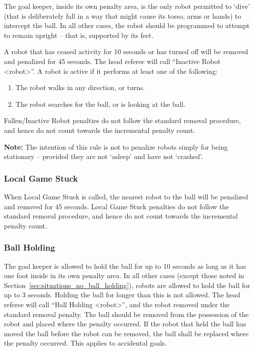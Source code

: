 The goal keeper, inside its own penalty area, is the only robot permitted to `dive' (that is deliberately fall in a way that might cause its torso, arms or hands) to intercept the ball. In all other cases, the robot should be programmed to attempt to remain upright -- that is, supported by its feet.

A robot that has ceased activity for 10 seconds or has turned off will be removed and penalized for 45 seconds.
The head referee will call ``Inactive Robot  \textless robot\textgreater''.
A robot is active if it performs at least one of the following:
\begin{enumerate}
	\item The robot walks in any direction, or turns.
	\item The robot searches for the ball, or is looking at the ball.
\end{enumerate}

Fallen/Inactive Robot penalties do not follow the standard removal procedure, and hence do not count towards the incremental penalty count.

\textbf{Note:} The intention of this rule is not to penalize robots simply for being stationary -- provided they are not `asleep' and have not `crashed'.

\subsubsection{Local Game Stuck}
\label{sec:pen_local_game_stuck}

When Local Game Stuck is called, the nearest robot to the ball will be penalized and removed for 45 seconds. Local Game Stuck penalties do not follow the standard removal procedure, and hence do not count towards the incremental penalty count.

\subsubsection{Ball Holding}
\label{sec:ball_holding}

The goal keeper is allowed to hold the ball for up to 10 seconds as long as it has one foot inside in its own penalty area.  In all other cases (except those noted in Section~\ref{sec:situations_no_ball_holding}), robots are allowed to hold the ball for up to 3 seconds. Holding the ball for longer than this is not allowed.
The head referee will call ``Ball Holding \textless robot\textgreater'', and the robot removed under the standard removal penalty.
The ball should be removed from the possession of the robot and placed where the penalty occurred.
If the robot that held the ball has moved the ball before the robot can be removed, the ball shall be replaced where the penalty occurred.
This applies to accidental goals.

